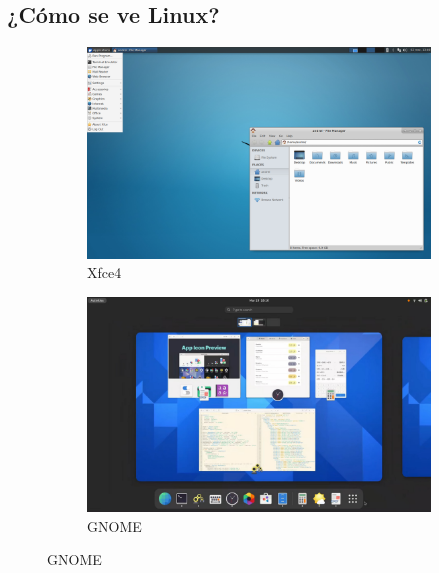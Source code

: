 \documentclass[aspectratio=43]{beamer}
\begin{document}
    \subsection{¿Cómo se ve Linux?}
     \begin{frame}{\subsecname}{}
        \begin{figure}
            \centering
            \begin{subfigure}{.4\textwidth}
                \centering
                \includegraphics[width=\textwidth]{img/xfce4.png}
                \caption*{Xfce4}
            \end{subfigure}
            \begin{subfigure}{.4\textwidth}
                \centering
                \includegraphics[width=\textwidth]{img/gnome.png}
                \caption*{GNOME}
            \end{subfigure}
        \end{figure}
        \begin{figure}

\end{figure}
\end{frame}
\end{document}
